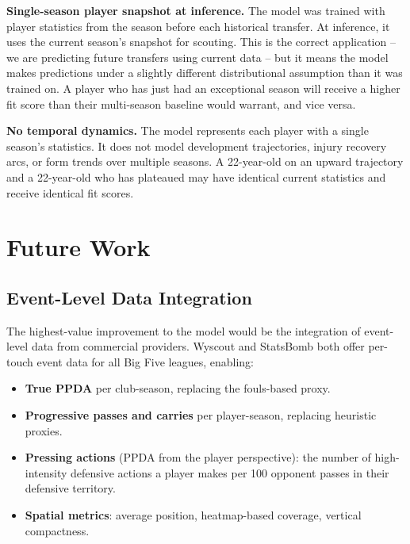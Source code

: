 \documentclass[12pt, a4paper, oneside]{report}
\begin{document}
\textbf{Single-season player snapshot at inference.} The model was trained with player statistics from the season before each historical transfer. At inference, it uses the current season's snapshot for scouting. This is the correct application -- we are predicting future transfers using current data -- but it means the model makes predictions under a slightly different distributional assumption than it was trained on. A player who has just had an exceptional season will receive a higher fit score than their multi-season baseline would warrant, and vice versa.

\textbf{No temporal dynamics.} The model represents each player with a single season's statistics. It does not model development trajectories, injury recovery arcs, or form trends over multiple seasons. A 22-year-old on an upward trajectory and a 22-year-old who has plateaued may have identical current statistics and receive identical fit scores.

\chapter{Future Work}
\label{chap:future}

\section{Event-Level Data Integration}

The highest-value improvement to the model would be the integration of event-level data from commercial providers. Wyscout \citep{wyscout2023} and StatsBomb \citep{statsbomb2023} both offer per-touch event data for all Big Five leagues, enabling:

\begin{itemize}[leftmargin=2em]
    \item \textbf{True PPDA} per club-season, replacing the fouls-based proxy.
    \item \textbf{Progressive passes and carries} per player-season, replacing heuristic proxies.
    \item \textbf{Pressing actions} (PPDA from the player perspective): the number of high-intensity defensive actions a player makes per 100 opponent passes in their defensive territory.
    \item \textbf{Spatial metrics}: average position, heatmap-based coverage, vertical compactness.
\end{itemize}
\end{document}

